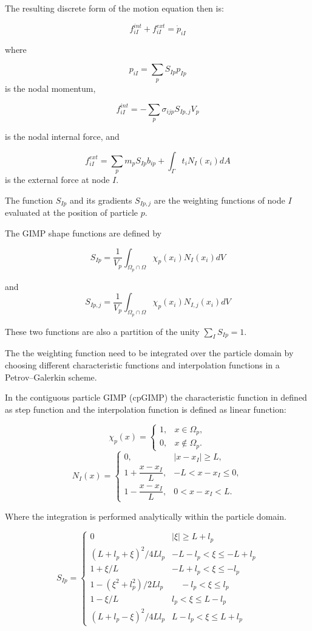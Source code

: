 \documentclass[11pt,a4paper]{article}
\begin{document}
The resulting discrete form of the motion equation then is:

$$ f_{iI}^{int} + f_{iI}^{ext} = \dot{p}_{iI} $$

where 

$$p_{iI} = \sum_p S_{Ip} p_{Ip}  $$
is the nodal momentum, 

$$ f_{iI}^{int} = -\sum_p \sigma_{ijp} S_{Ip,j} V_p  $$

is the nodal internal force, and

$$ f_{iI}^{ext} = \sum_p m_p S_{Ip} b_{ip} + \int_{\Gamma} t_i N_I(x_i) dA  $$
is the external force at node  $I$.

The function $S_{Ip}$ and its gradients  $S_{Ip,j}$ are the weighting functions of node  $I$ evaluated at the position of particle $p$.

The GIMP shape functions are defined by 

$$ S_{Ip} =  \frac{1}{V_p} \int_{\Omega_p \cap \Omega} \chi_p(x_i) N_I(x_i) dV $$

and 
$$ S_{Ip,j} =  \frac{1}{V_p} \int_{\Omega_p \cap \Omega} \chi_p(x_i) N_{I,j}(x_i) dV $$ 

These two functions are also a partition of the unity $\sum_I S_{Ip} = 1 $.

The the weighting function need to be integrated over
the particle domain by choosing different characteristic functions and interpolation functions in a Petrov–Galerkin scheme.

In the contiguous particle GIMP (cpGIMP) the characteristic function in defined as step function and the interpolation function is defined as linear function:

$$ \chi_p(x) =
\begin{cases}
1, & x \in \Omega_p, \\
0, & x \notin \Omega_p.
\end{cases} $$
$$
N_I(x)=
\begin{cases}
0, & |x-x_I| \ge L, \\
1+\dfrac{x-x_I}{L}, & -L < x-x_I \le 0, \\
1-\dfrac{x-x_I}{L}, & 0 < x-x_I < L.
\end{cases}
$$

Where the integration is performed analytically within the particle domain.

$$ S_{I p}=\left\{\begin{array}{ll}0 & |\xi| \geq L+l_p 
\\ 
\left(L+l_p+\xi\right)^2 / 4 L l_p & -L-l_p<\xi \leq-L+l_p 
\\ 
1+\xi / L & -L+l_p<\xi \leq-l_p 
\\ 
1-\left(\xi^2+l_p^2\right) / 2 L l_p & \quad-l_p<\xi \leq l_p 
\\ 
1-\xi / L & l_p<\xi \leq L-l_p 
\\ 
\left(L+l_p-\xi\right)^2 / 4 L l_p & L-l_p<\xi \leq L+l_p\end{array}\right.
$$
\end{document}
